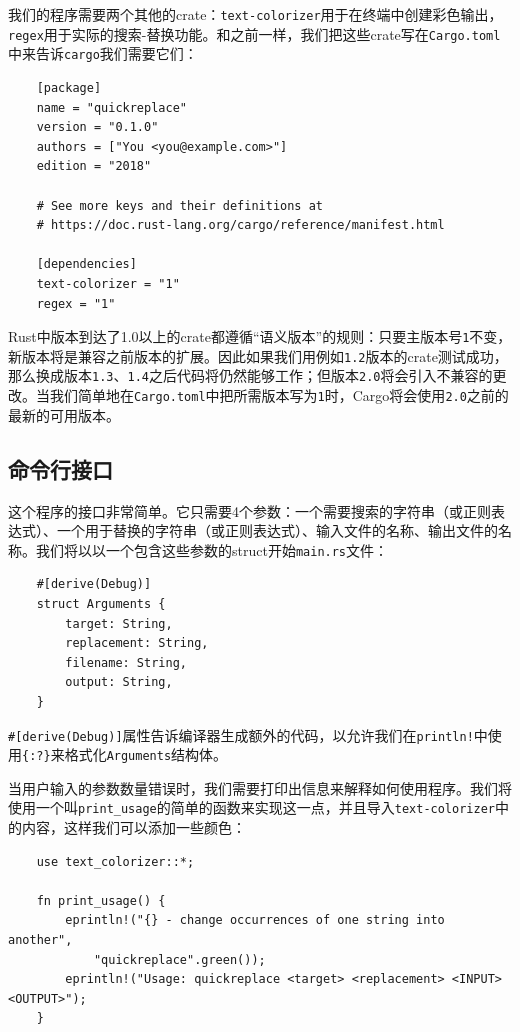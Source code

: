 我们的程序需要两个其他的crate：\texttt{text-colorizer}用于在终端中创建彩色输出，\texttt{regex}用于实际的搜索-替换功能。和之前一样，我们把这些crate写在\texttt{Cargo.toml}中来告诉\texttt{cargo}我们需要它们：
\begin{verbatim}
    [package]
    name = "quickreplace"
    version = "0.1.0"
    authors = ["You <you@example.com>"]
    edition = "2018"

    # See more keys and their definitions at
    # https://doc.rust-lang.org/cargo/reference/manifest.html
    
    [dependencies]
    text-colorizer = "1"
    regex = "1"
\end{verbatim}

Rust中版本到达了1.0以上的crate都遵循“语义版本”的规则：只要主版本号\texttt{1}不变，新版本将是兼容之前版本的扩展。因此如果我们用例如\texttt{1.2}版本的crate测试成功，那么换成版本\texttt{1.3}、\texttt{1.4}之后代码将仍然能够工作；但版本\texttt{2.0}将会引入不兼容的更改。当我们简单地在\texttt{Cargo.toml}中把所需版本写为\texttt{1}时，Cargo将会使用\texttt{2.0}之前的最新的可用版本。

\subsection{命令行接口}
这个程序的接口非常简单。它只需要4个参数：一个需要搜索的字符串（或正则表达式）、一个用于替换的字符串（或正则表达式）、输入文件的名称、输出文件的名称。我们将以以一个包含这些参数的struct开始\texttt{main.rs}文件：
\begin{verbatim}
    #[derive(Debug)]
    struct Arguments {
        target: String,
        replacement: String,
        filename: String,
        output: String,
    }
\end{verbatim}

\texttt{\#[derive(Debug)]}属性告诉编译器生成额外的代码，以允许我们在\texttt{println!}中使用\texttt{\{:?\}}来格式化\texttt{Arguments}结构体。

当用户输入的参数数量错误时，我们需要打印出信息来解释如何使用程序。我们将使用一个叫\texttt{print\_usage}的简单的函数来实现这一点，并且导入\texttt{text-colorizer}中的内容，这样我们可以添加一些颜色：
\begin{verbatim}
    use text_colorizer::*;

    fn print_usage() {
        eprintln!("{} - change occurrences of one string into another",
            "quickreplace".green());
        eprintln!("Usage: quickreplace <target> <replacement> <INPUT> <OUTPUT>");
    }
\end{verbatim}

